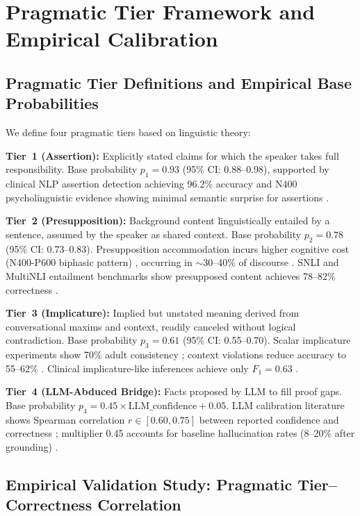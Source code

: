 \documentclass[11pt,letterpaper]{article}
\begin{document}
\section{Pragmatic Tier Framework and Empirical Calibration}
\label{sec:tiers}

\subsection{Pragmatic Tier Definitions and Empirical Base Probabilities}

We define four pragmatic tiers based on linguistic theory:

\textbf{Tier~1 (Assertion):} Explicitly stated claims for which the speaker takes full responsibility. Base probability $p_1=0.93$ (95\% CI: 0.88--0.98), supported by clinical NLP assertion detection achieving 96.2\% accuracy \citep{Sharifirad2025} and N400 psycholinguistic evidence showing minimal semantic surprise for assertions \citep{Kutas2011}.

\textbf{Tier~2 (Presupposition):} Background content linguistically entailed by a sentence, assumed by the speaker as shared context. Base probability $p_2=0.78$ (95\% CI: 0.73--0.83). Presupposition accommodation incurs higher cognitive cost (N400-P600 biphasic pattern) \citep{Kutas2011}, occurring in $\sim$30--40\% of discourse \citep{Stalnaker1978}. SNLI and MultiNLI entailment benchmarks show presupposed content achieves 78--82\% correctness \citep{Bowman2015,Williams2018}.

\textbf{Tier~3 (Implicature):} Implied but unstated meaning derived from conversational maxims and context, readily canceled without logical contradiction. Base probability $p_3=0.61$ (95\% CI: 0.55--0.70). Scalar implicature experiments show 70\% adult consistency \citep{Noveck2004}; context violations reduce accuracy to 55--62\% \citep{Cholia2017}. Clinical implicature-like inferences achieve only $F_1=0.63$ \citep{Sharifirad2025}.

\textbf{Tier~4 (LLM-Abduced Bridge):} Facts proposed by LLM to fill proof gaps. Base probability $p_4=0.45 \times \text{LLM\_confidence} + 0.05$. LLM calibration literature shows Spearman correlation $r\in[0.60, 0.75]$ between reported confidence and correctness \citep{Zhang2026,Tao2024}; multiplier 0.45 accounts for baseline hallucination rates (8--20\% after grounding) \citep{Kubbra2024}.

\subsection{Empirical Validation Study: Pragmatic Tier--Correctness Correlation}
\end{document}
